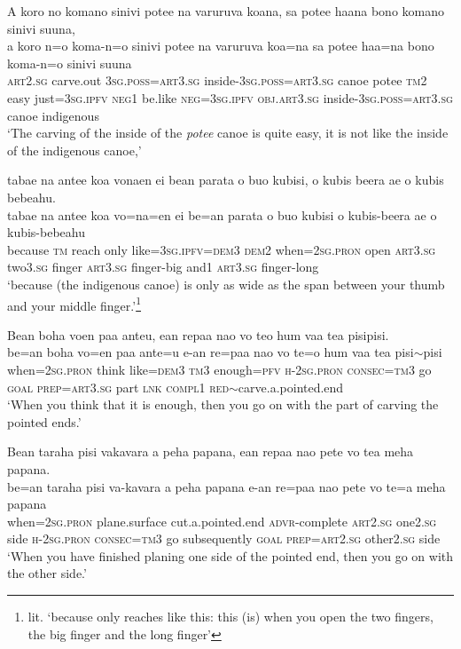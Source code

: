 \ea\label{ex:text18-14}
A koro no komano sinivi potee na varuruva koana, sa potee haana bono komano sinivi suuna,\\
\gll a	koro	n=o	koma-n=o	sinivi	potee	na	varuruva	koa=na	sa	potee	haa=na	bono	koma-n=o	sinivi	suuna\\
     \textsc{art}2.\textsc{sg}	carve.out	3\textsc{sg}.\textsc{poss}=\textsc{art}3.\textsc{sg}	inside-3\textsc{sg}.\textsc{poss}=\textsc{art}3.\textsc{sg}	canoe	potee	\textsc{tm}2	easy	just=3\textsc{sg}.\textsc{ipfv}	\textsc{neg}1	be.like	\textsc{neg}=3\textsc{sg}.\textsc{ipfv}	\textsc{obj}.\textsc{art}3.\textsc{sg}	inside-3\textsc{sg}.\textsc{poss}=\textsc{art}3.\textsc{sg}	canoe	indigenous\\
\glt `The carving of the inside of the \textit{potee} canoe is quite easy, it is not like the inside of the indigenous canoe,'
\z

\largerpage[2]
\ea\label{ex:text18-15}
tabae na antee koa vonaen ei bean parata o buo kubisi, o kubis beera ae o kubis bebeahu.\\
\gll tabae	na	antee	koa	vo=na=en	ei	be=an	parata	o	buo	kubisi	o	kubis-beera	ae	o	kubis-bebeahu\\
     because	\textsc{tm}	reach	only	like=3\textsc{sg}.\textsc{ipfv}=\textsc{dem}3	\textsc{dem}2	when=2\textsc{sg}.\textsc{pron}	open	\textsc{art}3.\textsc{sg}	two3.\textsc{sg}	finger	\textsc{art}3.\textsc{sg}	finger-big	and1	\textsc{art}3.\textsc{sg}	finger-long\\
\glt `because (the indigenous canoe) is only as wide as the span between your thumb and your middle finger.'\footnote{lit. `because only reaches like this: this (is) when you open the two fingers, the big finger and the long finger'}
\z\clearpage

\ea\label{ex:text18-16}
Bean boha voen paa anteu, ean repaa nao vo teo hum vaa tea pisipisi.\\
\gll be=an	boha	vo=en	paa	ante=u	e-an	re=paa	nao	vo	te=o	hum	vaa	tea	pisi{$\sim$}pisi\\
     when=2\textsc{sg}.\textsc{pron}	think	like=\textsc{dem}3	\textsc{tm}3	enough=\textsc{pfv}	\textsc{h}-2\textsc{sg}.\textsc{pron}	\textsc{consec}=\textsc{tm}3	go	\textsc{goal}	\textsc{prep}=\textsc{art}3.\textsc{sg}	part	\textsc{lnk}	\textsc{compl}1	\textsc{red}{$\sim$}carve.a.pointed.end\\
\glt `When you think that it is enough, then you go on with the part of carving the pointed ends.'
\z

\ea\label{ex:text18-17}
Bean taraha pisi vakavara a peha papana, ean repaa nao pete vo tea meha papana.\\
\gll be=an	taraha	pisi	va-kavara	a	peha	papana	e-an	re=paa	nao	pete	vo	te=a	meha	papana\\
     when=2\textsc{sg}.\textsc{pron}	plane.surface	cut.a.pointed.end	\textsc{advr}-complete	\textsc{art}2.\textsc{sg}	one2.\textsc{sg}	side	\textsc{h}-2\textsc{sg}.\textsc{pron}	\textsc{consec}=\textsc{tm}3	go	subsequently	\textsc{goal}	\textsc{prep}=\textsc{art}2.\textsc{sg}	other2.\textsc{sg}	side\\
\glt `When you have finished planing one side of the pointed end, then you go on with the other side.'
\z

